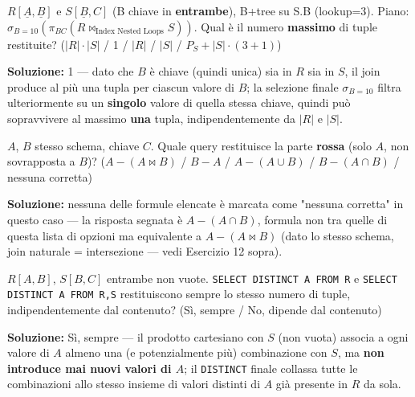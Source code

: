 \documentclass[12pt, a4paper]{article}
\begin{document}
\begin{tcolorbox}[colback=lightergray!10, colframe=tocsec, title=\textbf{Esercizio 31}]
$R[\underline{A},\underline{B}]$ e $S[\underline{B},C]$ (B chiave in \textbf{entrambe}), B+tree su S.B (lookup=3). Piano: $\sigma_{B=10}(\pi_{BC}(R \bowtie_{\text{Index Nested Loops}} S))$. Qual è il numero \textbf{massimo} di tuple restituite? ($|R|\cdot|S|$ / 1 / $|R|$ / $|S|$ / $P_S+|S|\cdot(3{+}1)$)
\end{tcolorbox}
\textbf{Soluzione:} 1 — dato che $B$ è chiave (quindi unica) sia in $R$ sia in $S$, il join produce al più una tupla per ciascun valore di $B$; la selezione finale $\sigma_{B=10}$ filtra ulteriormente su un \textbf{singolo} valore di quella stessa chiave, quindi può sopravvivere al massimo \textbf{una} tupla, indipendentemente da $|R|$ e $|S|$.

\begin{tcolorbox}[colback=lightergray!10, colframe=tocsec, title=\textbf{Esercizio 32}]
$A$, $B$ stesso schema, chiave $C$. Quale query restituisce la parte \textbf{rossa} (solo $A$, non sovrapposta a $B$)? ($A-(A\bowtie B)$ / $B-A$ / $A-(A\cup B)$ / $B-(A\cap B)$ / nessuna corretta)
\end{tcolorbox}
\textbf{Soluzione:} nessuna delle formule elencate è marcata come "nessuna corretta" in questo caso — la risposta segnata è \textcolor{tocsec}{$A-(A\cap B)$}, formula non tra quelle di questa lista di opzioni ma equivalente a $A-(A\bowtie B)$ (dato lo stesso schema, join naturale = intersezione — vedi Esercizio 12 sopra).

\begin{tcolorbox}[colback=lightergray!10, colframe=tocsec, title=\textbf{Esercizio 33}]
$R[A,B]$, $S[B,C]$ entrambe non vuote. \texttt{SELECT DISTINCT A FROM R} e \texttt{SELECT DISTINCT A FROM R,S} restituiscono sempre lo stesso numero di tuple, indipendentemente dal contenuto? (Sì, sempre / No, dipende dal contenuto)
\end{tcolorbox}
\textbf{Soluzione:} Sì, sempre — il prodotto cartesiano con $S$ (non vuota) associa a ogni valore di $A$ almeno una (e potenzialmente più) combinazione con $S$, ma \textbf{non introduce mai nuovi valori di $A$}; il \texttt{DISTINCT} finale collassa tutte le combinazioni allo stesso insieme di valori distinti di $A$ già presente in $R$ da sola.
\end{document}
